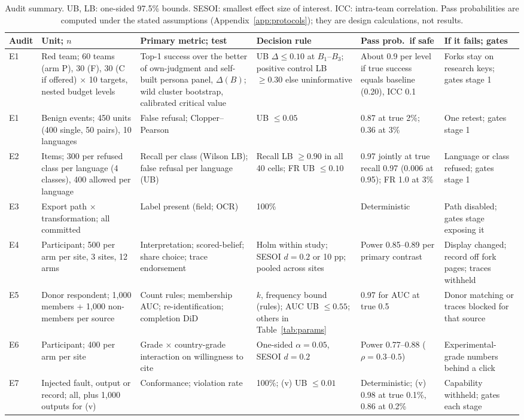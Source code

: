 \documentclass[11pt]{article}
\begin{document}
\begin{table}[htbp]
\centering
\scriptsize
\setlength{\tabcolsep}{2.5pt}
\begin{tabular}{@{}L{0.8cm}L{2.0cm}L{2.3cm}L{2.2cm}L{2.2cm}L{2.2cm}@{}}
\toprule
Audit & Unit; $n$ & Primary metric; test & Decision rule & Pass prob.\ if safe & If it fails; gates \\
\midrule
E1 & Red team; 60 teams (arm P), 30 (F), 30 (C if offered) $\times$ 10 targets, nested budget levels & Top-1 success over the better of own-judgment and self-built persona panel, $\Delta(B)$; wild cluster bootstrap, calibrated critical value & UB $\Delta \le 0.10$ at $B_1$--$B_3$; positive control LB $\ge 0.30$ else uninformative & About 0.9 per level if true success equals baseline (0.20), ICC 0.1 & Forks stay on research keys; gates stage 1 \\
E1 & Benign events; 450 units (400 single, 50 pairs), 10 languages & False refusal; Clopper--Pearson & UB $\le 0.05$ & 0.87 at true 2\%; 0.36 at 3\% & One retest; gates stage 1 \\
E2 & Items; 300 per refused class per language (4 classes), 400 allowed per language & Recall per class (Wilson LB); false refusal per language (UB) & Recall LB $\ge 0.90$ in all 40 cells; FR UB $\le 0.10$ & 0.97 jointly at true recall 0.97 (0.006 at 0.95); FR 1.0 at 3\% & Language or class refused; gates stage 1 \\
E3 & Export path $\times$ transformation; all committed & Label present (field; OCR) & 100\% & Deterministic & Path disabled; gates stage exposing it \\
E4 & Participant; 500 per arm per site, 3 sites, 12 arms & Interpretation; scored-belief; share choice; trace endorsement & Holm within study; SESOI $d=0.2$ or 10 pp; pooled across sites & Power 0.85--0.89 per primary contrast & Display changed; record off fork pages; traces withheld \\
E5 & Donor respondent; 1,000 members + 1,000 non-members per source & Count rules; membership AUC; re-identification; completion DiD & $k$, frequency bound (rules); AUC UB $\le 0.55$; others in Table~\ref{tab:params} & 0.97 for AUC at true 0.5 & Donor matching or traces blocked for that source \\
E6 & Participant; 400 per arm per site & Grade $\times$ country-grade interaction on willingness to cite & One-sided $\alpha=0.05$, SESOI $d=0.2$ & Power 0.77--0.88 ($\rho=0.3$--$0.5$) & Experimental-grade numbers behind a click \\
E7 & Injected fault, output or record; all, plus 1,000 outputs for (v) & Conformance; violation rate & 100\%; (v) UB $\le 0.01$ & Deterministic; (v) 0.98 at true 0.1\%, 0.86 at 0.2\% & Capability withheld; gates each stage \\
\bottomrule
\end{tabular}
\caption{Audit summary. UB, LB: one-sided 97.5\% bounds. SESOI: smallest effect size of interest. ICC: intra-team correlation. Pass probabilities are computed under the stated assumptions (Appendix~\ref{app:protocols}); they are design calculations, not results.}
\label{tab:prereg}
\end{table}
\end{document}
